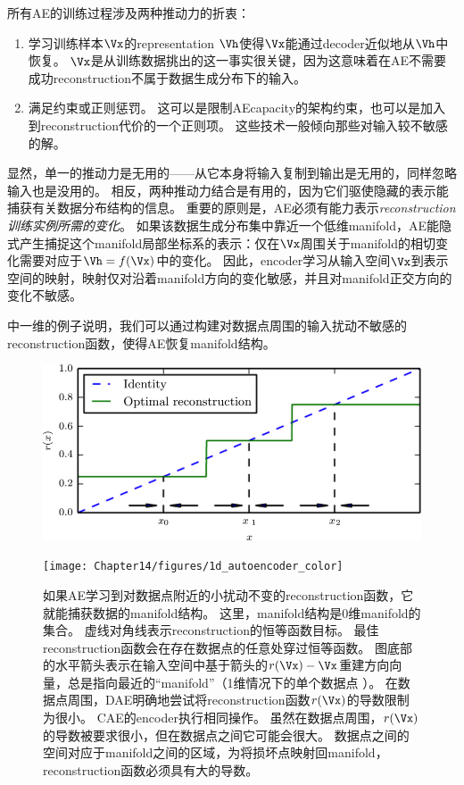 
所有\gls{AE}的训练过程涉及两种推动力的折衷：
\begin{enumerate}
 \item 学习训练样本$\Vx$的\gls{representation} $\Vh$使得$\Vx$能通过\gls{decoder}近似地从$\Vh$中恢复。
$\Vx$是从训练数据挑出的这一事实很关键，因为这意味着在\gls{AE}不需要成功\gls{reconstruction}不属于数据生成分布下的输入。
 \item 满足约束或正则惩罚。
这可以是限制\gls{AE}\gls{capacity}的架构约束，也可以是加入到\gls{reconstruction}代价的一个正则项。
这些技术一般倾向那些对输入较不敏感的解。
\end{enumerate}


显然，单一的推动力是无用的——从它本身将输入复制到输出是无用的，同样忽略输入也是没用的。
相反，两种推动力结合是有用的，因为它们驱使隐藏的表示能捕获有关数据分布结构的信息。
重要的原则是，\gls{AE}必须有能力表示\emph{\gls{reconstruction}训练实例所需的变化}。
如果该数据生成分布集中靠近一个低维\gls{manifold}，\gls{AE}能隐式产生捕捉这个\gls{manifold}局部坐标系的表示：仅在$\Vx$周围关于\gls{manifold}的相切变化需要对应于$\Vh=f(\Vx)$中的变化。
因此，\gls{encoder}学习从输入空间$\Vx$到表示空间的映射，映射仅对沿着\gls{manifold}方向的变化敏感，并且对\gls{manifold}正交方向的变化不敏感。


中一维的例子说明，我们可以通过构建对数据点周围的输入扰动不敏感的\gls{reconstruction}函数，使得\gls{AE}恢复\gls{manifold}结构。


\begin{figure}[!htb]
\ifOpenSource
\centerline{\includegraphics[scale=0.5]{images/124.png}}
\else
\centerline{\texttt{[image: Chapter14/figures/1d\_autoencoder\_color]}}
\fi
\caption{如果\gls{AE}学习到对数据点附近的小扰动不变的\gls{reconstruction}函数，它就能捕获数据的\gls{manifold}结构。
这里，\gls{manifold}结构是0维\gls{manifold}的集合。
虚线对角线表示\gls{reconstruction}的恒等函数目标。 
最佳\gls{reconstruction}函数会在存在数据点的任意处穿过恒等函数。
图底部的水平箭头表示在输入空间中基于箭头的$r(\Vx)-\Vx$重建方向向量，总是指向最近的``\gls{manifold}''（1维情况下的单个数据点 ）。
在数据点周围，\gls{DAE}明确地尝试将\gls{reconstruction}函数$r(\Vx)$的导数限制为很小。
\gls{CAE}的\gls{encoder}执行相同操作。
虽然在数据点周围，$r(\Vx)$的导数被要求很小，但在数据点之间它可能会很大。
数据点之间的空间对应于\gls{manifold}之间的区域，为将损坏点映射回\gls{manifold}，\gls{reconstruction}函数必须具有大的导数。
} \label{fig:chap14_1d_autoencoder_color}
\end{figure}

